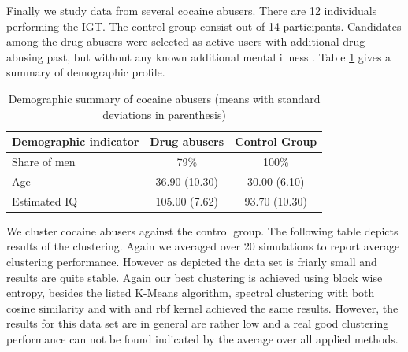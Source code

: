 \documentclass[12pt,a4paper,bibliography=totocnumbered,listof=totocnumbered]{scrartcl}
\begin{document}
{Finally we study data from several cocaine abusers. There are 12 individuals performing the IGT. The control group consist out of 14 participants. Candidates among the drug abusers were selected as active users with additional drug abusing past, but without any known additional mental illness \cite{Stout2004}. Table \ref{tab:cocs} gives a summary of demographic profile.

\setlength{\tabcolsep}{12pt}
\renewcommand{\arraystretch}{1}
\begin{table}[H]
	\centering 
		\caption{Demographic summary of cocaine abusers (means with standard deviations in parenthesis)}
	\begin{tabular}{lcc}
		\toprule
		\textbf{Demographic indicator} & \textbf{Drug abusers} & \textbf{Control Group} \\
		\hline
		Share of men &  79\% & 100\%\\
		Age & 36.90 (10.30) & 30.00 (6.10) \\
		Estimated IQ & 105.00 (7.62) & 93.70 (10.30) \\
		\bottomrule
	\end{tabular}
	\label{tab:cocs}
\end{table}

We cluster cocaine abusers against the control group. The following table depicts results of the clustering. Again we averaged over 20 simulations to report average clustering performance. However as depicted the data set is friarly small and results are quite stable. Again our best clustering is achieved using block wise entropy, besides the listed K-Means algorithm, spectral clustering with both cosine similarity and with and rbf kernel achieved the same results. However, the results for this data set are in general are rather low and a real good clustering performance can not be found indicated by the average over all applied methods. 

}
\end{document}
